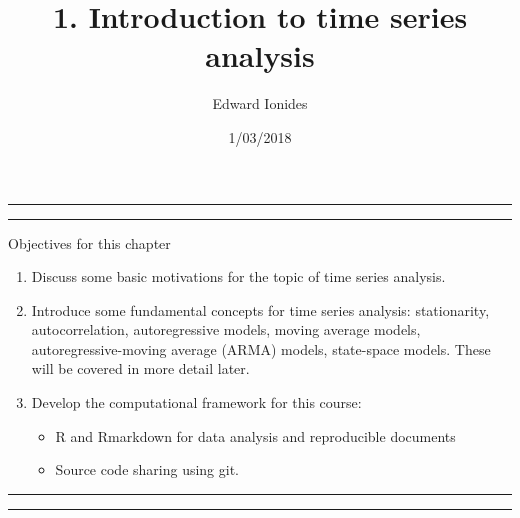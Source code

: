 \documentclass[]{article}
\title{1. Introduction to time series analysis}
\author{Edward Ionides}
\date{1/03/2018}
\providecommand{\tightlist}{%
  \setlength{\itemsep}{0pt}\setlength{\parskip}{0pt}}
\begin{document}
\maketitle

{
\setcounter{tocdepth}{2}
\tableofcontents
}
\newcommand\prob{\mathbb{P}}
\newcommand\E{\mathbb{E}}
\newcommand\SE{\mathrm{SE}}
\newcommand\var{\mathrm{Var}}
\newcommand\cov{\mathrm{Cov}}
\newcommand\loglik{\ell}
\newcommand\R{\mathbb{R}}
\newcommand\data[1]{#1^*}
\newcommand\estimate[1]{\data{#1}}
\newcommand\predict[1]{#1^{P*}}
\newcommand\given{\, ; \,}
\newcommand\transpose{\scriptsize{T}}





\begin{center}\rule{0.5\linewidth}{\linethickness}\end{center}

\begin{center}\rule{0.5\linewidth}{\linethickness}\end{center}

Objectives for this chapter

\begin{enumerate}
\def\labelenumi{\arabic{enumi}.}
\item
  Discuss some basic motivations for the topic of time series analysis.
\item
  Introduce some fundamental concepts for time series analysis:
  stationarity, autocorrelation, autoregressive models, moving average
  models, autoregressive-moving average (ARMA) models, state-space
  models. These will be covered in more detail later.
\item
  Develop the computational framework for this course:

  \begin{itemize}
  \tightlist
  \item
    R and Rmarkdown for data analysis and reproducible documents
  \item
    Source code sharing using git.
  \end{itemize}
\end{enumerate}

\begin{center}\rule{0.5\linewidth}{\linethickness}\end{center}

\begin{center}\rule{0.5\linewidth}{\linethickness}\end{center}
\end{document}
